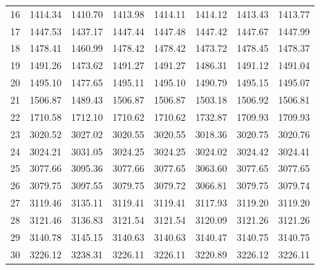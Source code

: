 \documentclass[10pt,oneside]{article}
\begin{document}
\begin{table}[h!]
\begin{tabular}{cccccccc}
16 &   1414.34 & 1410.70 & 1413.98 & 1414.11 &      1414.12 & 1413.43 & 1413.77 \\
17 &   1447.53 & 1437.17 & 1447.44 & 1447.48 &      1447.42 & 1447.67 & 1447.99 \\
18 &   1478.41 & 1460.99 & 1478.42 & 1478.42 &      1473.72 & 1478.45 & 1478.37 \\
19 &   1491.26 & 1473.62 & 1491.27 & 1491.27 &      1486.31 & 1491.12 & 1491.04 \\
20 &   1495.10 & 1477.65 & 1495.11 & 1495.10 &      1490.79 & 1495.15 & 1495.07 \\
21 &   1506.87 & 1489.43 & 1506.87 & 1506.87 &      1503.18 & 1506.92 & 1506.81 \\
22 &   1710.58 & 1712.10 & 1710.62 & 1710.62 &      1732.87 & 1709.93 & 1709.93 \\
23 &   3020.52 & 3027.02 & 3020.55 & 3020.55 &      3018.36 & 3020.75 & 3020.76 \\
24 &   3024.21 & 3031.05 & 3024.25 & 3024.25 &      3024.02 & 3024.42 & 3024.41 \\
25 &   3077.66 & 3095.36 & 3077.66 & 3077.65 &      3063.60 & 3077.65 & 3077.65 \\
26 &   3079.75 & 3097.55 & 3079.75 & 3079.72 &      3066.81 & 3079.75 & 3079.74 \\
27 &   3119.46 & 3135.11 & 3119.41 & 3119.41 &      3117.93 & 3119.20 & 3119.20 \\
28 &   3121.46 & 3136.83 & 3121.54 & 3121.54 &      3120.09 & 3121.26 & 3121.26 \\
29 &   3140.78 & 3145.15 & 3140.63 & 3140.63 &      3140.47 & 3140.75 & 3140.75 \\
30 &   3226.12 & 3238.31 & 3226.11 & 3226.11 &      3220.89 & 3226.12 & 3226.11 \\
\bottomrule
\end{tabular}
\end{table}

\clearpage
\end{document}
